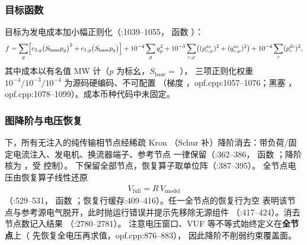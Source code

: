 \subsubsection*{目标函数}
目标为发电成本加小幅正则化（:1039--1055，
函数 ）：
\begin{align*}
f = \sum_{g}\Bigl[c_{2,g}\bigl(S_{\mathrm{base}}p_g\bigr)^{2}
  + c_{1,g}\bigl(S_{\mathrm{base}}p_g\bigr)\Bigr]
  + 10^{-4}\sum_{g} q_g^{2}
  + 10^{-3}\sum_{c,\varphi}\bigl((p^{ac}_{c,\varphi})^{2}+(q^{ac}_{c,\varphi})^{2}\bigr)
  + 10^{-4}\sum_{c} (p^{dc}_c)^{2},
\end{align*}
其中成本以有名值 MW 计（$p$ 为标幺，$S_{\mathrm{base}}=$ ），
三项正则化权重 $10^{-4}/10^{-3}/10^{-4}$ 为源码硬编码、不可配置
（梯度 ，opf.cpp:1057--1076；黑塞
，opf.cpp:1078--1099）。成本币种代码中未固定。

\subsubsection*{图降阶与电压恢复}
 下，所有无注入的纯传输相节点经稀疏 Kron
（Schur 补）降阶消去：带负荷/固定电流注入、发电机、换流器端子、参考节点
一律保留（:362--386，
函数 ；降阶核为
，受  控制）。
 下保留全部节点，恢复算子取单位阵（:387--395）。
全节点电压由恢复算子线性还原
\begin{align*}
V_{\mathrm{full}} = R\,V_{\mathrm{model}}
\end{align*}
（:529--531，
函数 ；恢复行缓存:409--416）。任一全节点的恢复行为空
表明该节点与参考源电气脱开，此时抛运行错误并提示先移除无源组件
（:417--424）。消去节点数记入结果 （:2780--2781）。
注意电压窗口、VUF 等不等式始终定义在\textbf{全节点}上（
 先恢复全电压再求值，opf.cpp:876--883），
因此降阶不削弱约束覆盖面。

